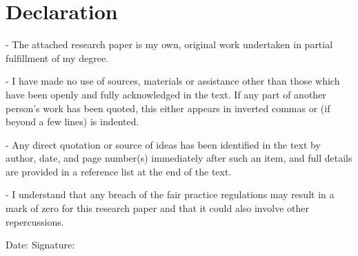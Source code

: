 \chapter*{Declaration}
\label{ch:declaration}

\begin{flushleft}
- The attached research paper is my own, original work undertaken in partial fulfillment of my degree.
\end{flushleft}

\begin{flushleft}
- I have made no use of sources, materials or assistance other than those which have been openly and fully acknowledged in the text. If any part of another person’s work has been quoted, this either appears in inverted commas or (if beyond a few lines) is indented.
\end{flushleft}

\begin{flushleft}
- Any direct quotation or source of ideas has been identified in the text by author, date, and page number(s) immediately after such an item, and full details are provided in a reference list at the end of the text.
\end{flushleft}

\begin{flushleft}
- I understand that any breach of the fair practice regulations may result in a mark of zero for this research paper and that it could also involve other repercussions.
\end{flushleft}

\vspace{1.5cm}

Date:	\hrulefill\enspace Signature: \hrulefill
\\[3.5cm]